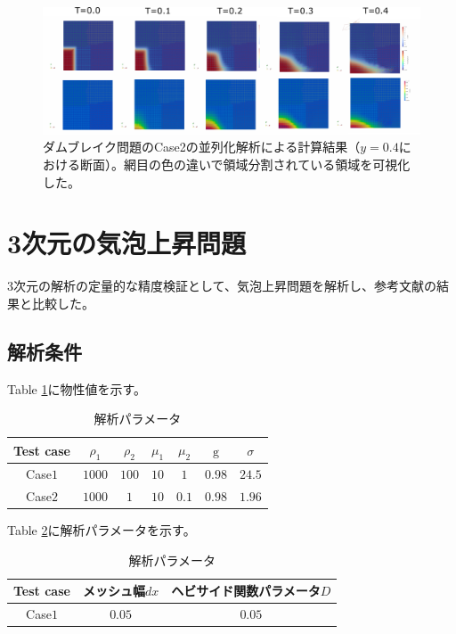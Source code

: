 \documentclass[8pt,a4paper]{article}
\begin{document}
\begin{figure}[H]
	\centering
	\includegraphics[width=18truecm]{pics/3d-dambreak-parallel/result-partition4.pdf}
	\caption{ダムブレイク問題のCase2の並列化解析による計算結果（$y=0.4$における断面）。網目の色の違いで領域分割されている領域を可視化した。}
	\label{fig:3d-dambreak-parallel-result}
\end{figure}

\newpage
\section{3次元の気泡上昇問題}
3次元の解析の定量的な精度検証として、気泡上昇問題を解析し、参考文献の結果と比較した。
\subsection{解析条件}
Table \ref{table:3d-bubble-material-property}に物性値を示す。

\renewcommand{\arraystretch}{1}
\begin{table}[H]
	\centering
	\caption{解析パラメータ}
	\begin{tabular}{ccccccc}
		\hline
		Test case & $\rho_1$ & $\rho_2$ & $\mu_1$ & $\mu_2$ & $\mathrm{g}$ & $\sigma$\\
		\hline 
		Case$1$ & $1000$ & $100$ & $10$ & $1$   & $0.98$ & $24.5$ \\
		Case$2$ & $1000$ & $1$   & $10$ & $0.1$ & $0.98$ & $1.96$ \\
		\hline         
	\end{tabular}
	\label{table:3d-bubble-material-property}
\end{table}
\renewcommand{\arraystretch}{1.0}

Table \ref{table:3d-bubble-parameter}に解析パラメータを示す。
\renewcommand{\arraystretch}{1}
\begin{table}[H]
	\centering
	\caption{解析パラメータ}
	\begin{tabular}{ccc}
		\hline
		Test case & メッシュ幅$dx$ & ヘビサイド関数パラメータ$D$\\
		\hline 
		Case$1$ & $0.05$ & $0.05$\\
		\hline         
	\end{tabular}
	\label{table:3d-bubble-parameter}
\end{table}
\renewcommand{\arraystretch}{1.0}
\end{document}
